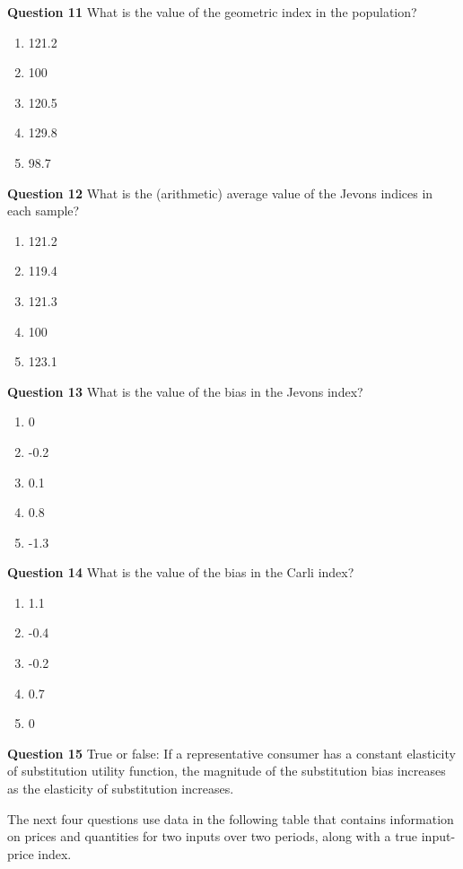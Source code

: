 \documentclass[
]{article}
\begin{document}
\textbf{Question 11} What is the value of the geometric index in the population?

\begin{enumerate}
\def\labelenumi{\alph{enumi})}
\item
  121.2
\item
  100
\item
  120.5
\item
  129.8
\item
  98.7
\end{enumerate}

\textbf{Question 12} What is the (arithmetic) average value of the Jevons indices in each sample?

\begin{enumerate}
\def\labelenumi{\alph{enumi})}
\item
  121.2
\item
  119.4
\item
  121.3
\item
  100
\item
  123.1
\end{enumerate}

\textbf{Question 13} What is the value of the bias in the Jevons index?

\begin{enumerate}
\def\labelenumi{\alph{enumi})}
\item
  0
\item
  -0.2
\item
  0.1
\item
  0.8
\item
  -1.3
\end{enumerate}

\textbf{Question 14} What is the value of the bias in the Carli index?

\begin{enumerate}
\def\labelenumi{\alph{enumi})}
\item
  1.1
\item
  -0.4
\item
  -0.2
\item
  0.7
\item
  0
\end{enumerate}

\textbf{Question 15} True or false: If a representative consumer has a constant elasticity of substitution utility function, the magnitude of the substitution bias increases as the elasticity of substitution increases.

The next four questions use data in the following table that contains information on prices and quantities for two inputs over two periods, along with a true input-price index.
\end{document}
